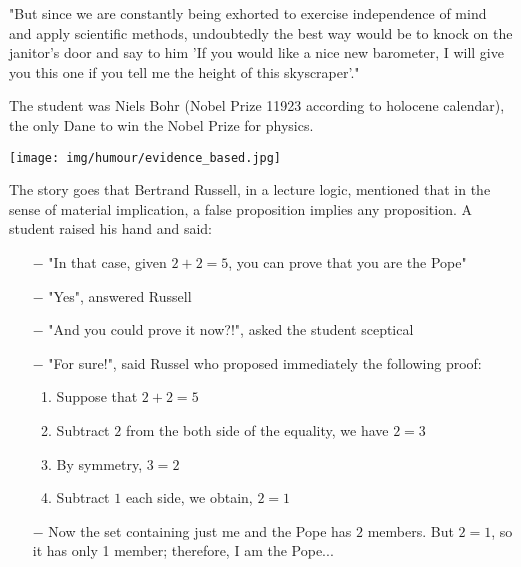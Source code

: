 "But since we are constantly being exhorted to exercise independence of mind and apply scientific methods, undoubtedly the best way would be to knock on the janitor's door and say to him 'If you would like a nice new barometer, I will give you this one if you tell me the height of this skyscraper'." 

The student was Niels Bohr (Nobel Prize 11923 according to holocene calendar), the only Dane to win the Nobel Prize for physics. 
\begin{center}\underline{\hspace{5 cm}}\end{center}
\begin{center}
	\texttt{[image: img/humour/evidence\_based.jpg]}	
\end{center}
\pagebreak
The story goes that Bertrand Russell, in a lecture logic, mentioned that in the sense of material implication, a false proposition implies any proposition. A student raised his hand and said:

\begin{itemize}	 
	\item[$-$] "In that case, given $2+2=5$, you can prove that you are the Pope"

	\item[$-$] "Yes", answered Russell

	\item[$-$] "And you could prove it now?!", asked the student sceptical

	\item[$-$] "For sure!", said Russel who proposed immediately the following proof:

	\begin{enumerate}
		\item Suppose that $2 + 2 = 5$

		\item Subtract $2$ from the both side of the equality, we have $2 = 3$

		\item By symmetry, $3 = 2$

		\item Subtract $1$ each side, we obtain, $2 =1$
	\end{enumerate}

	\item[$-$] Now the set containing just me and the Pope has $2$ members. But $2=1$, so it has only 1 member; therefore, I am the Pope...
\end{itemize}

